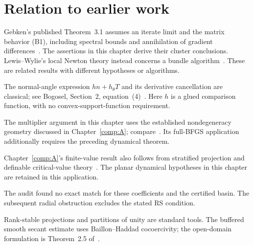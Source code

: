 \endgroup


\section*{Relation to earlier work}
Gebken's published Theorem~3.1 assumes an iterate limit and the matrix behavior (B1), including spectral bounds and annihilation of gradient differences~\cite{BG}. The assertions in this chapter derive their cluster conclusions. Lewis--Wylie's local Newton theory instead concerns a bundle algorithm~\cite{LW}. These are related results with different hypotheses or algorithms.

The normal-angle expression $h n+h_\theta T$ and its derivative cancellation are classical; see Bogosel, Section~2, equation~(4)~\cite{geom_Bogosel2023}. Here $h$ is a glued comparison function, with no convex-support-function requirement.

The multiplier argument in this chapter uses the established nondegeneracy geometry discussed in Chapter~\ref{comp:A}; compare~\cite{LW,BG}. Its full-BFGS application additionally requires the preceding dynamical theorem.

Chapter~\ref{comp:A}'s finite-value result also follows from stratified projection and definable critical-value theory~\cite{BDLS}. The planar dynamical hypotheses in this chapter are retained in this application.

The audit found no exact match for these coefficients and the certified basin. The subsequent radial obstruction excludes the stated RS condition.

Rank-stable projections and partitions of unity are standard tools. The buffered smooth secant estimate uses Baillon--Haddad cocoercivity; the open-domain formulation is Theorem~2.5 of~\cite{WW}.
